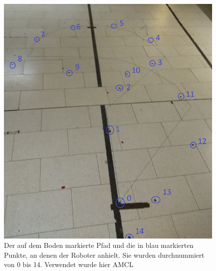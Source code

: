 \documentclass[11pt,a4paper]{article}
\begin{document}
\begin{figure}[ht]
  \centering
  \includegraphics[scale = 0.9]{pfadAMCL.png}
  \caption{Der auf dem Boden markierte Pfad und die in blau markierten Punkte, an denen der Roboter anhielt. Sie wurden durchnummiert von 0 bis 14.
   Verwendet wurde hier AMCL}
  \label{fig: pfadAMCL}
  \end{figure}
\end{document}
